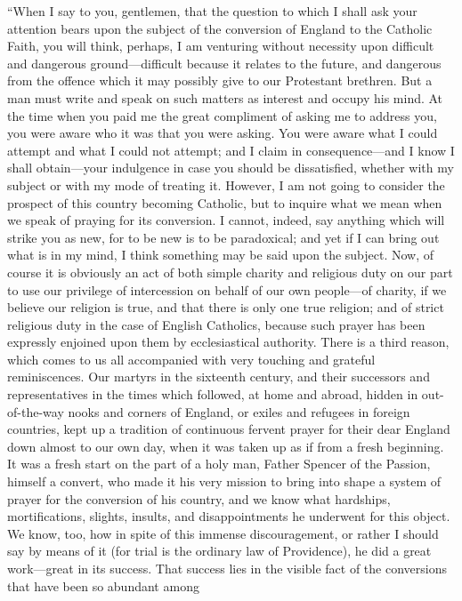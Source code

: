``When I say to you, gentlemen, that the question to which I
shall ask your attention bears upon the subject of the conversion of
England to the Catholic Faith, you will think, perhaps, I am venturing
without necessity upon difficult and dangerous ground—difficult
because it relates to the future, and dangerous from the offence which
it may possibly give to our Protestant brethren. But a man must
write and speak on such matters as interest and occupy his mind. At
the time when you paid me the great compliment of asking me to address
you, you were aware who it was that you were asking. You were aware
what I could attempt and what I could not attempt; and I claim in
consequence—and I know I shall obtain—your indulgence in case you
should be dissatisfied, whether with my subject or with my mode of
treating it. However, I am not going to consider the prospect of this
country becoming Catholic, but to inquire what we mean when we speak
of praying for its conversion. I cannot, indeed, say anything which
will strike you as new, for to be new is to be paradoxical; and yet if
I can bring out what is in my mind, I think something may be said upon
the subject. Now, of course it is obviously an act of both simple
charity and religious duty on our part to use our privilege of
intercession on behalf of our own people—of charity, if we believe
our religion is true, and that there is only one true religion; and of
strict religious duty in the case of English Catholics, because such
prayer has been expressly enjoined upon them by ecclesiastical
authority. There is a third reason, which comes to us all accompanied
with very touching and grateful reminiscences. Our martyrs in the
sixteenth century, and their successors and representatives in the
times which followed, at home and abroad, hidden in out-of-the-way
nooks and corners of England, or exiles and refugees in foreign
countries, kept up a tradition of continuous fervent prayer for their
dear England down almost to our own day, when it was taken up as if
from a fresh beginning. It was a fresh start on the part of a holy
man, Father Spencer of the Passion, himself a convert, who made it his
very mission to bring into shape a system of prayer for the conversion
of his country, and we know what hardships, mortifications, slights,
insults, and disappointments he underwent for this object. We know,
too, how in spite of this immense discouragement, or rather I should
say by means of it (for trial is the ordinary law of Providence), he
did a great work—great in its success. That success lies in the
visible fact of the conversions that have been so abundant among
